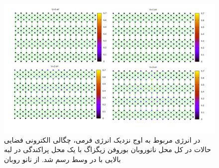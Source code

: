 \begin{figure}[!ht]
  \centering
  \includegraphics[width=1\linewidth]{./figures/Slide1.PNG}
  \caption{در انرژی مربوط به اوج  نزدیک انرژی فرمی، چگالی الکترونی فضایی حالات در کل محل نانوروبان بوروفن زیگزاگ با یک محل پراکندگی در لبه بالایی با  در وسط رسم شد. از نانو روبان}
  \label{zigCSLDOS}
\end{figure}

